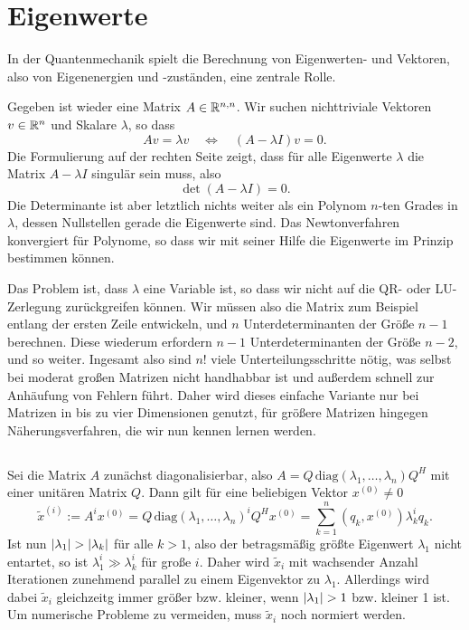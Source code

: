 \section{Eigenwerte}

In der Quantenmechanik spielt die Berechnung von Eigenwerten- und
Vektoren, also von Eigenenergien und -zuständen, eine zentrale Rolle.

Gegeben ist wieder eine Matrix $A\in\mathbb{R}^{n,n}$. Wir suchen
nichttriviale Vektoren $v\in\mathbb{R}^n$ und Skalare $\lambda$, so dass
\begin{equation}
  Av = \lambda v \quad\iff\quad (A-\lambda I)v = 0.
\end{equation}
Die Formulierung auf der rechten Seite zeigt, dass für alle Eigenwerte
$\lambda$ die Matrix $A-\lambda I$ singulär sein muss, also
\begin{equation}
  \det (A-\lambda I) = 0.
\end{equation}
Die Determinante ist aber letztlich nichts weiter als ein Polynom
$n$-ten Grades in $\lambda$, dessen Nullstellen gerade die Eigenwerte
sind. Das Newtonverfahren konvergiert für Polynome, so dass wir mit
seiner Hilfe die Eigenwerte im Prinzip bestimmen können.

Das Problem ist, dass $\lambda$ eine Variable ist, so dass wir nicht
auf die QR- oder LU-Zerlegung zurückgreifen können. Wir müssen also
die Matrix zum Beispiel entlang der ersten Zeile entwickeln, und $n$
Unterdeterminanten der Größe $n-1$ berechnen. Diese wiederum erfordern
$n-1$ Unterdeterminanten der Größe $n-2$, und so weiter. Ingesamt also
sind $n!$ viele Unterteilungsschritte nötig, was selbst bei moderat
großen Matrizen nicht handhabbar ist und außerdem schnell zur
Anhäufung von Fehlern führt. Daher wird dieses einfache Variante nur
bei Matrizen in bis zu vier Dimensionen genutzt, für größere Matrizen
hingegen Näherungsverfahren, die wir nun kennen lernen werden.

\subsection{}

Sei die Matrix $A$ zunächst diagonalisierbar, also
$A=Q\,\text{diag}(\lambda_1,\ldots,\lambda_n)Q^H$ mit einer unitären Matrix
$Q$. Dann gilt für eine beliebigen Vektor $x^{(0)}\neq 0$
\begin{equation}
  \tilde{x}^{(i)} := A^i x^{(0)} = Q\,\text{diag}(\lambda_1,\ldots,\lambda_n)^i Q^H x^{(0)}
  = \sum_{k=1}^n (q_k, x^{(0)}) \lambda_k^i q_k.
\end{equation}
Ist nun $\left\lvert{\lambda_1}\right\rvert>\left\lvert{\lambda_k}\right\rvert$ für alle $k>1$, also der
betragsmäßig größte Eigenwert $\lambda_1$ nicht entartet, so ist
$\lambda_1^i\gg\lambda_k^i$ für große $i$. Daher wird $\tilde{x}_i$
mit wachsender Anzahl Iterationen zunehmend parallel zu einem
Eigenvektor zu $\lambda_1$. Allerdings wird dabei $\tilde{x}_i$
gleichzeitg immer größer bzw. kleiner, wenn $\left\lvert{\lambda_1}\right\rvert > 1$
bzw. kleiner 1 ist. Um numerische Probleme zu vermeiden, muss
$\tilde{x}_i$ noch normiert werden.

